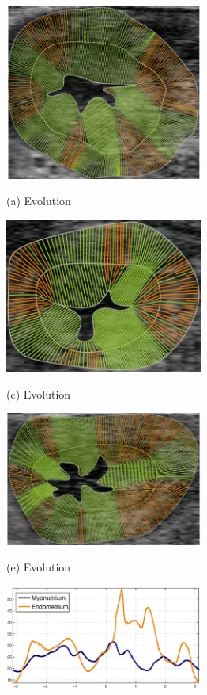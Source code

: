 \documentclass{article}
\begin{document}
\begin{figure}[t]
\begin{minipage}[b]{.33\linewidth}
  \centering
  \centerline{\includegraphics[width=6.5cm]{pics/real}}
  \centerline{(a) Evolution}\medskip
\end{minipage}
\hfill
\begin{minipage}[b]{.33\linewidth}
  \centering
  \centerline{\includegraphics[width=6.5cm]{pics/real4}}
  \centerline{(c) Evolution}\medskip
\end{minipage}
\hfill
\begin{minipage}[b]{.33\linewidth}
  \centering
  \centerline{\includegraphics[width=6.5cm]{pics/real3}}
  \centerline{(e) Evolution}\medskip
\end{minipage}
\hfill
\begin{minipage}[b]{.33\linewidth}
  \centering
  \centerline{\includegraphics[width=6.5cm]{pics/realWidth}}

\end{minipage}
\end{figure}
\end{document}
